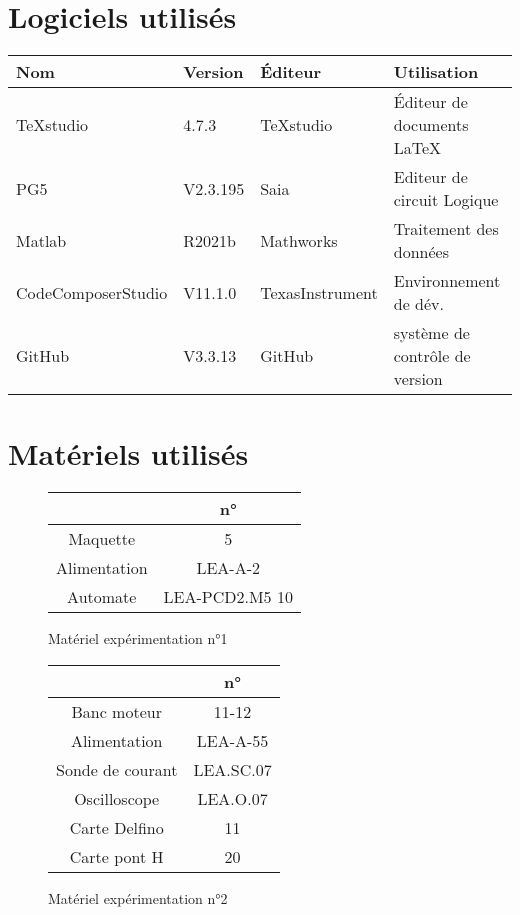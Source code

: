 \section{Logiciels utilisés}
\begin{longtable}{p{4cm}p{1.5cm}p{3.5cm}p{5cm}}
	\toprule
	Nom & Version & Éditeur & Utilisation\\
	\midrule\endhead 
	TeXstudio & 4.7.3 & TeXstudio & Éditeur de documents \LaTeX\\
	PG5 & V2.3.195 & Saia & Editeur de circuit Logique\\
	Matlab & R2021b& Mathworks & Traitement des données\\
	CodeComposerStudio & V11.1.0& TexasInstrument & Environnement de dév.\\
	GitHub & V3.3.13 & GitHub & système de contrôle de version\\
	\bottomrule
\end{longtable}

\section{Matériels utilisés}


\begin{figure}[h]
	\centering
	\begin{tabular}{|c|c|}
		\hline
		& n°   \\
		\hline
		Maquette& 5  \\
		\hline
		Alimentation& LEA-A-2   \\
		\hline
		Automate& LEA-PCD2.M5 10  \\
		\hline
	\end{tabular}
	\caption{Matériel expérimentation n°1}
\end{figure}



\begin{figure}[h]
	\centering
	\begin{tabular}{|c|c|}
		\hline
		& n°   \\
		\hline
		Banc moteur& 11-12  \\
		\hline
		Alimentation& LEA-A-55   \\
		\hline
		Sonde de courant& LEA.SC.07  \\
		\hline
		Oscilloscope& LEA.O.07  \\
		\hline
		Carte Delfino& 11  \\
		\hline
		Carte pont H& 20  \\
		\hline
	\end{tabular}
	\caption{Matériel expérimentation n°2}
\end{figure}
\newpage
